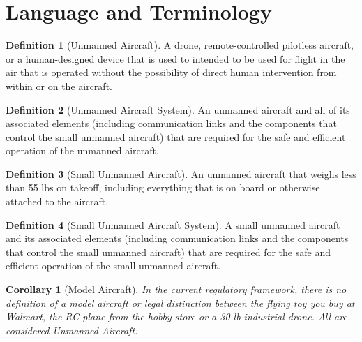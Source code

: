 \documentclass[
]{book}
\newtheorem{corollary}{Corollary}[chapter]
\theoremstyle{definition}
\newtheorem{definition}{Definition}[chapter]
\theoremstyle{definition}
\theoremstyle{definition}
\theoremstyle{remark}
\begin{document}
\hypertarget{language-and-terminology}{%
\section{Language and Terminology}\label{language-and-terminology}}

\begin{definition}[Unmanned Aircraft]
\protect\hypertarget{def:defUA}{}{\label{def:defUA} {} }A drone, remote-controlled pilotless aircraft, or a human-designed device that is used to intended to be used for flight in the air that is operated without the possibility of direct human intervention from within or on the aircraft.
\end{definition}

\begin{definition}[Unmanned Aircraft System]
\protect\hypertarget{def:defUAS}{}{\label{def:defUAS} {} }An unmanned aircraft and all of its associated elements (including communication links and the components that control the small unmanned aircraft) that are required for the safe and efficient operation of the unmanned aircraft.
\end{definition}

\begin{definition}[Small Unmanned Aircraft]
\protect\hypertarget{def:defSUA}{}{\label{def:defSUA} {} }An unmanned aircraft that weighs less than 55 lbs on takeoff, including everything that is on board or otherwise attached to the aircraft.
\end{definition}

\begin{definition}[Small Unmanned Aircraft System]
\protect\hypertarget{def:defSUAS}{}{\label{def:defSUAS} {} }A small unmanned aircraft and its associated elements (including communication links and the components that control the small unmanned aircraft) that are required for the safe and efficient operation of the small unmanned aircraft.
\end{definition}

\begin{corollary}[Model Aircraft]
\protect\hypertarget{cor:defMA}{}{\label{cor:defMA} {} }In the current regulatory framework, there is no definition of a model aircraft or legal distinction between the flying toy you buy at Walmart, the RC plane from the hobby store or a 30 lb industrial drone. All are considered Unmanned Aircraft.
\end{corollary}
\end{document}

